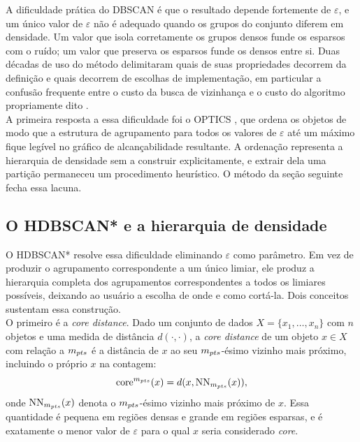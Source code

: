 A dificuldade prática do \ac{DBSCAN} é que o resultado depende fortemente de $\varepsilon$, e um único valor de $\varepsilon$ não é adequado quando os grupos do conjunto diferem em densidade. Um valor que isola corretamente os grupos densos funde os esparsos com o ruído; um valor que preserva os esparsos funde os densos entre si. Duas décadas de uso do método delimitaram quais de suas propriedades decorrem da definição e quais decorrem de escolhas de implementação, em particular a confusão frequente entre o custo da busca de vizinhança e o custo do algoritmo propriamente dito \cite{dbscan-revisited}.\\

A primeira resposta a essa dificuldade foi o \ac{OPTICS} \cite{optics}, que ordena os objetos de modo que a estrutura de agrupamento para todos os valores de $\varepsilon$ até um máximo fique legível no gráfico de alcançabilidade resultante. A ordenação representa a hierarquia de densidade sem a construir explicitamente, e extrair dela uma partição permaneceu um procedimento heurístico. O método da seção seguinte fecha essa lacuna.\\

\subsection{O HDBSCAN* e a hierarquia de densidade\label{sec:hdbscan}}

O \ac{HDBSCAN*} \cite{hdbscan} resolve essa dificuldade eliminando $\varepsilon$ como parâmetro. Em vez de produzir o agrupamento correspondente a um único limiar, ele produz a hierarquia completa dos agrupamentos correspondentes a todos os limiares possíveis, deixando ao usuário a escolha de onde e como cortá-la. Dois conceitos sustentam essa construção.\\

O primeiro é a \textit{core distance}. Dado um conjunto de dados $X = \{x_1, \dots, x_n\}$ com $n$ objetos e uma medida de distância $d(\cdot,\cdot)$, a \textit{core distance} de um objeto $x \in X$ com relação a $m_{pts}$ é a distância de $x$ ao seu $m_{pts}$-ésimo vizinho mais próximo, incluindo o próprio $x$ na contagem:
\begin{equation}
\label{eq:coredist}
\mathrm{core}^{m_{pts}}(x) = d(x, \mathrm{NN}_{m_{pts}}(x)),
\end{equation}
onde $\mathrm{NN}_{m_{pts}}(x)$ denota o $m_{pts}$-ésimo vizinho mais próximo de $x$. Essa quantidade é pequena em regiões densas e grande em regiões esparsas, e é exatamente o menor valor de $\varepsilon$ para o qual $x$ seria considerado \textit{core}.\\

